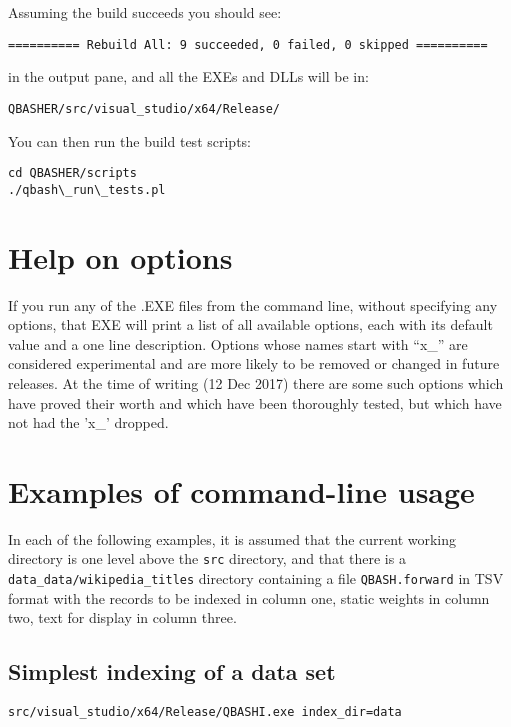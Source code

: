 \documentclass{article}
\begin{document}
\noindent Assuming the build succeeds you should see:

\begin{verbatim}
========== Rebuild All: 9 succeeded, 0 failed, 0 skipped ==========
\end{verbatim}

\noindent in the output pane, and all the EXEs and DLLs will be in:

\begin{verbatim}
QBASHER/src/visual_studio/x64/Release/
\end{verbatim}

\noindent You can then run the build test scripts:
\begin{verbatim}
cd QBASHER/scripts    
./qbash\_run\_tests.pl   
\end{verbatim}



\section{Help on options}
If you run any of the .EXE files from the command line, without
specifying any options, that EXE will print a list of all available
options, each with its default value and a one line description.
Options whose names start with ``x\_'' are considered experimental and
are more likely to be removed or changed in future releases.    At the
time of writing (12 Dec 2017) there are some such options which have
proved their worth and which have been thoroughly tested, but which
have not had the 'x\_' dropped.


\section{Examples of command-line usage}

In each of the following examples, it is assumed that the current
working directory is one level above the \texttt{src} directory, and
that there is a \texttt{data\_data/wikipedia\_titles} directory containing a file
\texttt{QBASH.forward} in TSV format with the records to be
indexed in column one, static weights in column two, text for display
in column three.


\subsection{Simplest indexing of a data set}

{\footnotesize
\begin{verbatim}
src/visual_studio/x64/Release/QBASHI.exe index_dir=data
\end{verbatim}
}
\end{document}

